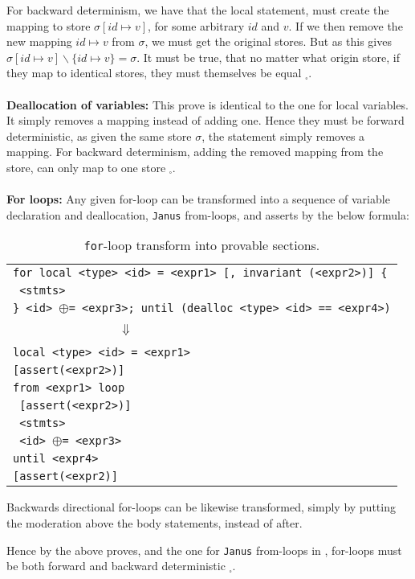 For backward determinism, we have that the local statement, must create the mapping to store
$\sigma[id \mapsto v]$, for some arbitrary $id$ and $v$. If we then remove the new mapping
$id \mapsto v$ from $\sigma$, we must get the original stores. But as this gives
$\sigma[id \mapsto v] \backslash \{id \mapsto v\} = \sigma$. It must be true, that no matter what
origin store, if they map to identical stores, they must themselves be equal $_\square$.
\\
\\
\textbf{Deallocation of variables:}
This prove is identical to the one for local variables. It simply removes a mapping instead of
adding one. Hence they must be forward deterministic, as given the same store $\sigma$, the 
statement simply removes a mapping. For backward determinism, adding the removed mapping from
the store, can only map to one store $_\square$.
\\
\\
\textbf{For loops:}
Any given \lan for-loop can be transformed into a sequence of \lan variable declaration and
deallocation, \texttt{Janus} from-loops, and \lan asserts by the below formula:

\begin{table}[H]
    \centering
    \begin{tabular}{l}
        \texttt{for local <type> <id> = <expr1> [, invariant (<expr2>)] \{} \\
        \texttt{ <stmts>} \\
        \texttt{\} <id> $\oplus$= <expr3>; until (dealloc <type> <id> == <expr4>)} \\ \\
        $~~~~~~~~~~~~~~~~~~~~~~~~~~~~~~~~~~~~~\Downarrow$ \\ \\
        \texttt{local <type> <id> = <expr1>} \\
        \texttt{[assert(<expr2>)]} \\
        \texttt{from <expr1> loop} \\
        \texttt{  [assert(<expr2>)]} \\
        \texttt{  <stmts>} \\
        \texttt{  <id> $\oplus$= <expr3>} \\
        \texttt{until <expr4>} \\
        \texttt{[assert(<expr2)]}
    \end{tabular}
    \caption{\texttt{for}-loop transform into provable sections.}
    \label{table:for-loop-transform}
\end{table}
\noindent
Backwards directional for-loops can be likewise transformed, simply by putting the
moderation above the body statements, instead of after.

Hence by the above proves, and the one for \texttt{Janus} from-loops in \cite{janus}, \lan
for-loops must be both forward and backward deterministic $_\square$.